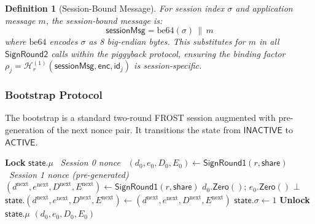 \documentclass[11pt,a4paper]{article}
\newtheorem{definition}{Definition}[section]
\newcommand{\id}{\mathsf{id}}
\newcommand{\hash}{\mathcal{H}}
\begin{document}
\begin{definition}[Session-Bound Message]
  \label{def:session-msg}
  For session index $\sigma$ and application message $m$, the session-bound
  message is:
  \begin{equation}
    \mathsf{sessionMsg} = \mathrm{be64}(\sigma) \,\|\, m
    \label{eq:session-msg}
  \end{equation}
  where $\mathrm{be64}$ encodes $\sigma$ as 8 big-endian bytes.  This
  substitutes for $m$ in all $\mathsf{SignRound2}$ calls within the
  piggyback protocol, ensuring the binding factor
  $\rho_j = \hash_r^{(1)}(\mathsf{sessionMsg}, \mathsf{enc}, \id_j)$ is
  session-specific.
\end{definition}

\subsubsection{Bootstrap Protocol}
\label{sec:piggyback-bootstrap}

The bootstrap is a standard two-round FROST session augmented with
pre-generation of the next nonce pair.  It transitions the state from
$\mathsf{INACTIVE}$ to $\mathsf{ACTIVE}$.

\begin{algorithm}[H]
\caption{$\mathsf{BootstrapRound1}(r,\, \mathsf{state},\, \mathsf{share})$}
\label{alg:bootstrap-r1}
\begin{algorithmic}[1]
\State \textbf{Lock} $\mathsf{state}.\mu$
\Statex \hrulefill\ \textit{Session 0 nonce}\ \hrulefill
\State $(d_0, e_0, D_0, E_0) \leftarrow \mathsf{SignRound1}(r, \mathsf{share})$
\Statex \hrulefill\ \textit{Session 1 nonce (pre-generated)}\ \hrulefill
\State $(d^{\mathrm{next}}, e^{\mathrm{next}}, D^{\mathrm{next}}, E^{\mathrm{next}})
  \leftarrow \mathsf{SignRound1}(r, \mathsf{share})$
  \State $d_0.\mathsf{Zero}()$;\; $e_0.\mathsf{Zero}()$
  \State \Return $\bot$
\EndIf
\State $\mathsf{state}.(d^{\mathrm{next}}, e^{\mathrm{next}}, D^{\mathrm{next}}, E^{\mathrm{next}})
  \leftarrow (d^{\mathrm{next}}, e^{\mathrm{next}}, D^{\mathrm{next}}, E^{\mathrm{next}})$
\State $\mathsf{state}.\sigma \leftarrow 1$
\State \textbf{Unlock} $\mathsf{state}.\mu$
\State \Return $(d_0, e_0, D_0, E_0)$
\end{algorithmic}
\end{algorithm}
\end{document}
